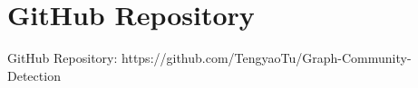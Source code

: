 \documentclass[ %
                    author={Tengyao Tu},
                supervisor={Dr. James Pope},
                    degree={MSc},
                     title={A New Perspective on Graph Community Detection: Combining Traditional Methods with Deep Learning Approaches},
                  subtitle={Applying to Telecom Networks and Diverse Datasets},
                      type={},
                      year={2024}]{dissertation}
\begin{document}

%
%

\backmatter






\appendix

\chapter{GitHub Repository}
\label{appx:example}
GitHub Repository: https://github.com/TengyaoTu/Graph-Community-Detection



\end{document}

